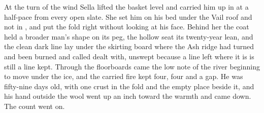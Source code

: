 At the turn of the wind Sella lifted the basket level and carried him up  in  at a half-pace from every open slate. She set him on his bed under the Vail roof and not in , and put the fold right without looking at his face. Behind her the coat held a broader man's shape on its peg, the hollow seat its twenty-year lean, and the clean dark line lay under the skirting board where the Ash ridge had turned and been burned and called dealt with, unswept because a line left where it is is still a line kept. Through the floorboards came the low note of the river beginning to move under the ice, and the carried fire kept four, four and a gap. He was fifty-nine days old, with one crust in the fold and the empty place beside it, and his hand outside the wool went up an inch toward the warmth and came down. The count went on.
